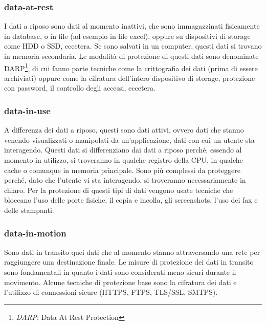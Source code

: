     \subsubsection{data-at-rest}
        I dati a riposo sono dati al momento inattivi, che sono immagazzinati fisicamente in database,
        o in file (ad esempio in file excel), oppure su dispositivi di storage come HDD o SSD, eccetera.
        Se sono salvati in un computer, questi dati si trovano in memoria secondaria.
        Le modalità di protezione di questi dati sono denominate DARP\footnote{\textit{DARP}: Data At Rest Protection}, 
        di cui fanno parte tecniche come la crittografia dei dati (prima di essere archiviati) oppure come la cifratura
        dell'intero dispositivo di storage, protezione con password, il controllo degli accessi, eccetera.

    \subsubsection{data-in-use}
        A differenza dei dati a riposo, questi sono dati attivi, ovvero dati che stanno venendo
        visualizzati o manipolati da un'applicazione, dati con cui un utente sta interagendo. 
        Questi dati si differenziano dai dati a riposo perché, essendo al momento in utilizzo, 
        si troveranno in qualche registro della CPU, in qualche cache 
        o comunque in memoria principale. Sono più complessi da proteggere perché, dato che l'utente vi sta
        interagendo, si troveranno necessariamente in chiaro. Per la protezione di questi tipi di dati
        vengono usate tecniche che bloccano l'uso delle porte fisiche, il copia e incolla, gli screenshots, l'uso dei fax
        e delle stampanti.

    \subsubsection{data-in-motion}
        Sono dati in transito quei dati che al momento stanno attraversando una rete per raggiungere 
        una destinazione finale. Le misure di protezione dei dati in transito sono fondamentali in quanto
        i dati sono considerati meno sicuri durante il movimento.
        Alcune tecniche di protezione base sono la cifratura dei dati
        e l'utilizzo di connessioni sicure (HTTPS, FTPS, TLS/SSL, SMTPS).

